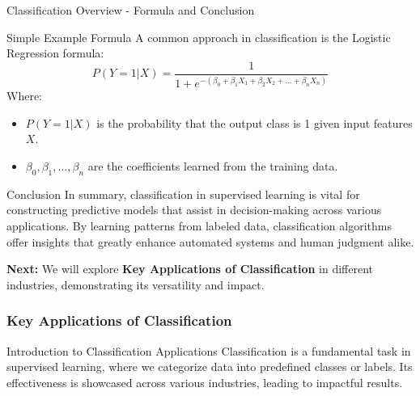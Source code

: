 \documentclass[aspectratio=169]{beamer}
\begin{document}
\begin{frame}[fragile]{Classification Overview - Formula and Conclusion}
    \begin{block}{Simple Example Formula}
        A common approach in classification is the Logistic Regression formula:
        \begin{equation}
            P(Y=1|X) = \frac{1}{1 + e^{-(\beta_0 + \beta_1X_1 + \beta_2X_2 + ... + \beta_nX_n)}}
        \end{equation}
        Where:
        \begin{itemize}
            \item $P(Y=1|X)$ is the probability that the output class is 1 given input features $X$.
            \item $\beta_0, \beta_1, \ldots, \beta_n$ are the coefficients learned from the training data.
        \end{itemize}
    \end{block}
    
    \begin{block}{Conclusion}
        In summary, classification in supervised learning is vital for constructing predictive models that assist in decision-making across various applications. By learning patterns from labeled data, classification algorithms offer insights that greatly enhance automated systems and human judgment alike.
    \end{block}
    
    \textbf{Next:} We will explore \textbf{Key Applications of Classification} in different industries, demonstrating its versatility and impact.
\end{frame}

\begin{frame}[fragile]
    \frametitle{Key Applications of Classification}
    \begin{block}{Introduction to Classification Applications}
        Classification is a fundamental task in supervised learning, where we categorize data into predefined classes or labels. Its effectiveness is showcased across various industries, leading to impactful results.
    \end{block}
\end{frame}
\end{document}
